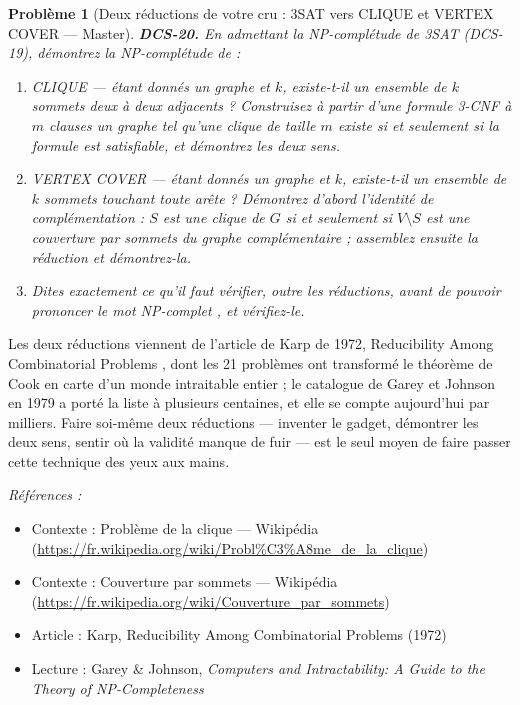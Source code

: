 \documentclass[11pt]{article}
\newtheorem{problem}{Problème}
\newenvironment{refs}{\par\small\noindent\emph{Références :}\begin{itemize}\setlength\itemsep{0pt}}{\end{itemize}\normalsize}
\begin{document}
\bigskip

\begin{problem}[{Deux réductions de votre cru : 3SAT vers CLIQUE et VERTEX COVER --- Master}]
\textbf{DCS-20.} En admettant la NP-complétude de 3SAT (DCS-19), démontrez la NP-complétude de :
\begin{enumerate}
\item[(a)] CLIQUE --- étant donnés un graphe et $k$, existe-t-il un ensemble de $k$ sommets deux à deux adjacents ? Construisez à partir d'une formule 3-CNF à $m$ clauses un graphe tel qu'une clique de taille $m$ existe si et seulement si la formule est satisfiable, et démontrez les deux sens.
\item[(b)] VERTEX COVER --- étant donnés un graphe et $k$, existe-t-il un ensemble de $k$ sommets touchant toute arête ? Démontrez d'abord l'identité de complémentation : $S$ est une clique de $G$ si et seulement si $V \setminus S$ est une couverture par sommets du graphe complémentaire ; assemblez ensuite la réduction et démontrez-la.
\item[(c)] Dites exactement ce qu'il faut vérifier, outre les réductions, avant de pouvoir prononcer le mot \og{} NP-complet \fg{}, et vérifiez-le.
\end{enumerate}

\end{problem}

\noindent Les deux réductions viennent de l'article de Karp de 1972, \og{} Reducibility Among Combinatorial Problems \fg{}, dont les 21 problèmes ont transformé le théorème de Cook en carte d'un monde intraitable entier ; le catalogue de Garey et Johnson en 1979 a porté la liste à plusieurs centaines, et elle se compte aujourd'hui par milliers. Faire soi-même deux réductions --- inventer le gadget, démontrer les deux sens, sentir où la validité manque de fuir --- est le seul moyen de faire passer cette technique des yeux aux mains.

\begin{refs}
\item Contexte : Problème de la clique --- Wikipédia (\url{https://fr.wikipedia.org/wiki/Probl%C3%A8me_de_la_clique})
\item Contexte : Couverture par sommets --- Wikipédia (\url{https://fr.wikipedia.org/wiki/Couverture_par_sommets})
\item Article : Karp, \og{} Reducibility Among Combinatorial Problems \fg{} (1972)
\item Lecture : Garey \& Johnson, \textit{Computers and Intractability: A Guide to the Theory of NP-Completeness}
\end{refs}
\end{document}
